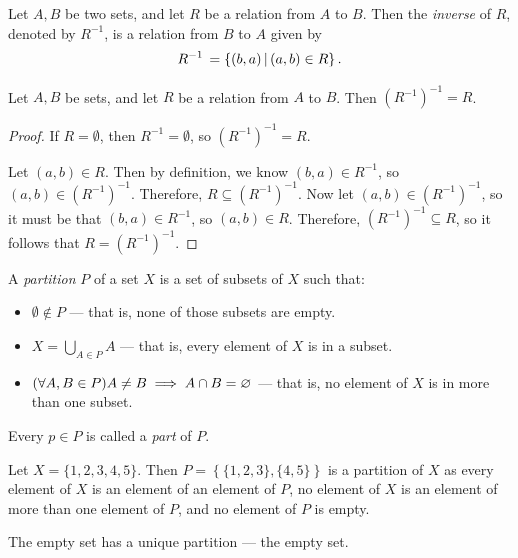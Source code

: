 \begin{defn}
    Let $A, B$ be two sets, and let $R$ be a relation from $A$ to $B$. Then the \emph{inverse} of $R$, denoted by $R^{-1}$, is a relation from $B$ to $A$ given by \[R^{-1} \,= \left\{(b, a) \,\middle|\, (a, b) \in R \right\}.\]
\end{defn}

\begin{prop}
    Let $A, B$ be sets, and let $R$ be a relation from $A$ to $B$. Then $\left(R^{-1}\right)^{-1} = R$.
\end{prop}

\begin{proof}
    If $R = \emptyset$, then $R^{-1} = \emptyset$, so $\left(R^{-1}\right)^{-1} = R$.

    Let $(a, b) \in R$. Then by definition, we know $(b, a) \in R^{-1}$, so $(a, b) \in \left(R^{-1}\right)^{-1}$. Therefore, $R \subseteq \left(R^{-1}\right)^{-1}$. Now let $(a, b) \in \left(R^{-1}\right)^{-1}$, so it must be that $(b, a) \in R^{-1}$, so $(a, b) \in R$. Therefore, $\left(R^{-1}\right)^{-1} \subseteq R$, so it follows that $R = \left(R^{-1}\right)^{-1}$.
\end{proof}

\begin{defn}\label{partition}
    A \emph{partition} $P$ of a set $X$ is a set of subsets of $X$ such that:
    \begin{itemize}
        \item $\emptyset \notin P$ --- that is, none of those subsets are empty.
        \item $X = \bigcup_{A\in P}A$ --- that is, every element of $X$ is in a subset.
        \item $(\forall A, B \in P) A \neq B \implies A \cap B = \varnothing$ --- that is, no element of $X$ is in more than one subset.
    \end{itemize}
    Every $p \in P$ is called a \emph{part} of $P$.
\end{defn}

\begin{exmp}
    Let $X = \{1, 2, 3, 4, 5\}$. Then $P = \left\{\{1, 2, 3\}, \{4, 5\}\right\}$ is a partition of $X$ as every element of $X$ is an element of an element of $P$, no element of $X$ is an element of more than one element of $P$, and no element of $P$ is empty.
\end{exmp}

\begin{exmp}
    The empty set has a unique partition --- the empty set.
\end{exmp}

